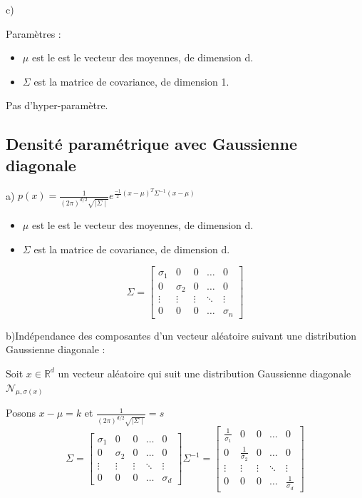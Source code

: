 \documentclass[a4paper,10pt]{article}
\begin{document}
c)

Paramètres :
\begin{itemize}
	\item $\mu$ est le est le vecteur des moyennes, de dimension d.
	\item $\Sigma$ est la matrice de covariance, de dimension 1.
\end{itemize}

Pas d'hyper-paramètre.


\subsection{Densité paramétrique avec Gaussienne diagonale}

a) $p(x) = \frac{1}{(2 \pi)^{d/2} \sqrt{\mid{\Sigma} \mid}} e^{\frac{-1}{2} (x- \mu)^{T} \Sigma^{-1} (x- \mu) }$
\begin{itemize}
	\item $\mu$ est le est le vecteur des moyennes, de dimension d.
	\item $\Sigma$ est la matrice de covariance, de dimension d.
\end{itemize}

\[
\Sigma =
\begin{bmatrix}
    \sigma_{1} & 0 & 0 & \dots  & 0 \\
    0 & \sigma_{2} & 0 & \dots  & 0 \\
    \vdots & \vdots & \vdots & \ddots & \vdots \\
    0 & 0 & 0 & \dots  & \sigma_{n}
\end{bmatrix}
\]

b)Indépendance des composantes d'un vecteur aléatoire suivant une distribution Gaussienne diagonale :

Soit $x \in \mathds{R}^{d}$ un vecteur aléatoire qui suit une distribution Gaussienne diagonale $\mathcal{N}_{\mu , \sigma(x)}$

Posons $x - \mu = k$ et $\frac{1}{(2 \pi)^{d/2} \sqrt{\mid{\Sigma} \mid}} = s$
\[
\Sigma =
\begin{bmatrix}
    \sigma_{1} & 0 & 0 & \dots  & 0 \\
    0 & \sigma_{2} & 0 & \dots  & 0 \\
    \vdots & \vdots & \vdots & \ddots & \vdots \\
    0 & 0 & 0 & \dots  & \sigma_{d}
\end{bmatrix}
\Sigma^{-1} =
\begin{bmatrix}
    \frac{1}{\sigma_{1}} & 0 & 0 & \dots  & 0 \\
    0 & \frac{1}{\sigma_{2}} & 0 & \dots  & 0 \\
    \vdots & \vdots & \vdots & \ddots & \vdots \\
    0 & 0 & 0 & \dots  & \frac{1}{\sigma_{d}}
\end{bmatrix}
\]
\end{document}
